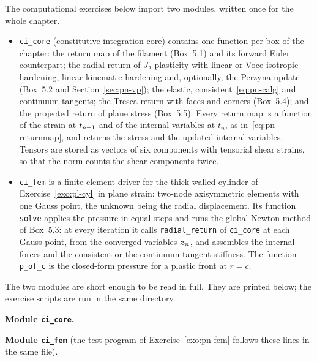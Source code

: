 \label{sec:pn-aux}%
%
The computational exercises below import two modules, written once for the
whole chapter.
\begin{itemize}
  \item \texttt{ci\_core} (constitutive integration core) contains one
  function per box of the chapter: the return map of the filament (Box~5.1)
  and its forward Euler counterpart; the radial return of $J_2$ plasticity
  with linear or Voce isotropic hardening, linear kinematic hardening and,
  optionally, the Perzyna update (Box~5.2 and Section~\ref{sec:pn-vp}); the
  elastic, consistent~\eqref{eq:pn-calg} and continuum tangents; the Tresca
  return with faces and corners (Box~5.4); and the projected return of plane
  stress (Box~5.5). Every return map is a function of the strain at $t_{n+1}$
  and of the internal variables at $t_n$, as in~\eqref{eq:pn-returnmap}, and
  returns the stress and the updated internal variables. Tensors are stored as
  vectors of six components with tensorial shear strains, so that the norm
  counts the shear components twice.
  \item \texttt{ci\_fem} is a finite element driver for the thick-walled
  cylinder of Exercise~\ref{exo:pl-cyl} in plane strain: two-node
  axisymmetric elements with one Gauss point, the unknown being the radial
  displacement. Its function \texttt{solve} applies the pressure in equal
  steps and runs the global Newton method of Box~5.3: at every iteration it
  calls \texttt{radial\_return} of \texttt{ci\_core} at each Gauss point, from
  the converged variables $\bm{z}_n$, and assembles the internal forces and the
  consistent or the continuum tangent stiffness. The function
  \texttt{p\_of\_c} is the closed-form pressure for a plastic front at $r=c$.
\end{itemize}
The two modules are short enough to be read in full. They are printed below;
the exercise scripts are run in the same directory.

\medskip\noindent\textsf{\textbf{Module \texttt{ci\_core}.}}

\medskip\noindent\textsf{\textbf{Module \texttt{ci\_fem}}} (the test program of
Exercise~\ref{exo:pn-fem} follows these lines in the same file).



